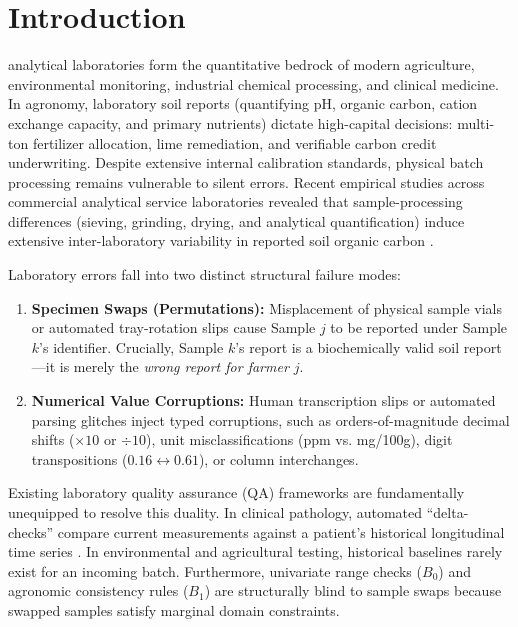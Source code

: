 \documentclass[journal,twoside]{IEEEtran}
\begin{document}
\section{Introduction}
 analytical laboratories form the quantitative bedrock of modern agriculture, environmental monitoring, industrial chemical processing, and clinical medicine. In agronomy, laboratory soil reports (quantifying pH, organic carbon, cation exchange capacity, and primary nutrients) dictate high-capital decisions: multi-ton fertilizer allocation, lime remediation, and verifiable carbon credit underwriting. Despite extensive internal calibration standards, physical batch processing remains vulnerable to silent errors. Recent empirical studies across commercial analytical service laboratories revealed that sample-processing differences (sieving, grinding, drying, and analytical quantification) induce extensive inter-laboratory variability in reported soil organic carbon \cite{even2025large}.

Laboratory errors fall into two distinct structural failure modes:
\begin{enumerate}
    \item \textbf{Specimen Swaps (Permutations):} Misplacement of physical sample vials or automated tray-rotation slips cause Sample $j$ to be reported under Sample $k$'s identifier. Crucially, Sample $k$'s report is a biochemically valid soil report—it is merely the \emph{wrong report for farmer $j$}.
    \item \textbf{Numerical Value Corruptions:} Human transcription slips or automated parsing glitches inject typed corruptions, such as orders-of-magnitude decimal shifts ($\times 10$ or $\div 10$), unit misclassifications (ppm vs. mg/100g), digit transpositions ($0.16 \leftrightarrow 0.61$), or column interchanges.
\end{enumerate}

Existing laboratory quality assurance (QA) frameworks are fundamentally unequipped to resolve this duality. In clinical pathology, automated ``delta-checks'' compare current measurements against a patient's historical longitudinal time series \cite{westgard2020laboratory, rosenbaum2018machine}. In environmental and agricultural testing, historical baselines rarely exist for an incoming batch. Furthermore, univariate range checks ($B_0$) and agronomic consistency rules ($B_1$) are structurally blind to sample swaps because swapped samples satisfy marginal domain constraints.
\end{document}
